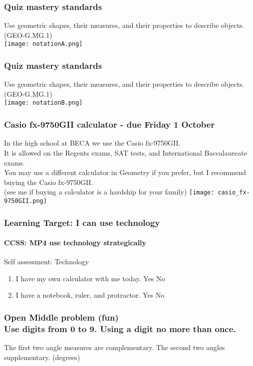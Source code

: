 \documentclass{beamer}
\begin{document}
\frame
{
  \frametitle{Quiz mastery standards}
   Use geometric shapes, their measures, and their properties to describe objects. (GEO-G.MG.1)\\
    \texttt{[image: notationA.png]}
}

\frame
{
  \frametitle{Quiz mastery standards}
   Use geometric shapes, their measures, and their properties to describe objects. (GEO-G.MG.1)\\
    \texttt{[image: notationB.png]}
}

  \frame
  {
    \frametitle{Casio fx-9750GII calculator - due Friday 1 October}
    \begin{multicols}{2}
    In the high school at BECA we use the Casio fx-9750GII.\\[5pt] 
    It is allowed on the Regents exams, SAT tests, and International Baccalaureate exams.\\[5pt]
    You may use a different calculator in Geometry if you prefer, but I recommend buying the Casio fx-9750GII.\\[5pt]
    (see me if buying a calculator is a hardship for your family)
    \texttt{[image: casio\_fx-9750GII.png]}
    \end{multicols}
  }

  \frame
  {
    \frametitle{Learning Target: I can use technology}
    \framesubtitle{CCSS: MP4 use technology strategically}
  
    \begin{block}{Self assessment: Technology}
      
      \begin{enumerate}
      \item I have my own calculator with me today. Yes \qquad No
      \item I have a notebook, ruler, and protractor. Yes \qquad No
      \end{enumerate}
    \end{block}
  }

  \frame
  {
    \frametitle{Open Middle problem (fun) \\
    Use digits from 0 to 9. Using a digit no more than once.}
      The first two angle measures are complementary. The second two angles supplementary. (degrees)\\[0.75cm]
         \vspace{5cm} 
  }
\end{document}
